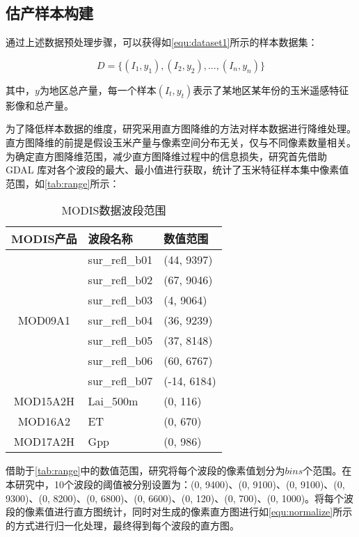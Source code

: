 \subsection{估产样本构建}

\par 通过上述数据预处理步骤，可以获得如\autoref{equ:dataset1}所示的样本数据集：

\begin{equation}
  \label{equ:dataset1}
  D=\{(I_1, y_1),(I_2, y_2), ..., (I_n, y_n)\}
\end{equation}

\par 其中，$y$为地区总产量，每一个样本$(I_t, y_t)$表示了某地区某年份的玉米遥感特征影像和总产量。

\par 为了降低样本数据的维度，研究采用直方图降维的方法对样本数据进行降维处理。直方图降维的前提是假设玉米产量与像素空间分布无关，仅与不同像素数量相关。为确定直方图降维范围，减少直方图降维过程中的信息损失，研究首先借助 GDAL 库对各个波段的最大、最小值进行获取，统计了玉米特征样本集中像素值范围，如\autoref{tab:range}所示：

\begin{table}
  \centering
  \caption{MODIS数据波段范围}
  \label{tab:range}
  \begin{tabularx}{\linewidth}{cX<{\centering}X<{\centering}}
    \toprule
    MODIS产品 & 波段名称 & 数值范围 \\
    \midrule
    & sur\_refl\_b01 & (44, 9397) \\
    & sur\_refl\_b02 & (67, 9046) \\
    & sur\_refl\_b03 & (4, 9064) \\
    MOD09A1 & sur\_refl\_b04 & (36, 9239) \\
    & sur\_refl\_b05 & (37, 8148) \\
    & sur\_refl\_b06 & (60, 6767) \\
    & sur\_refl\_b07 & (-14, 6184) \\ \hline
    MOD15A2H  & Lai\_500m & (0, 116) \\ \hline
    MOD16A2   & ET & (0, 670) \\ \hline
    MOD17A2H  & Gpp & (0, 986) \\
    \bottomrule
\end{tabularx}
\end{table}

\par 借助于\autoref{tab:range}中的数值范围，研究将每个波段的像素值划分为$bins$个范围。在本研究中，10个波段的阈值被分别设置为：(0, 9400)、(0, 9100)、(0, 9100)、(0, 9300)、(0, 8200)、(0, 6800)、(0, 6600)、(0, 120)、(0, 700)、(0, 1000)。将每个波段的像素值进行直方图统计，同时对生成的像素直方图进行如\autoref{equ:normalize}所示的方式进行归一化处理，最终得到每个波段的直方图。

